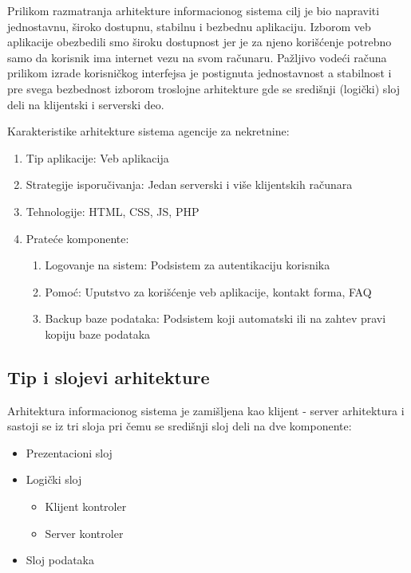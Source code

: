 \documentclass[20pt]{article}
\begin{document}
\indent Prilikom razmatranja arhitekture informacionog sistema cilj je bio napraviti jednostavnu, \v {s}iroko dostupnu, stabilnu i bezbednu aplikaciju. Izborom veb aplikacije obezbedili smo \v {s}iroku dostupnost jer je za njeno kori\v {s}\' {c}enje potrebno samo da korisnik ima internet vezu na svom ra\v {c}unaru. Pa\v {z}ljivo vode\' {c}i ra\v {c}una prilikom izrade korisni\v {c}kog interfejsa je postignuta jednostavnost a stabilnost i pre svega bezbednost izborom troslojne arhitekture gde se sredi\v {s}nji (logi\v {c}ki) sloj deli na klijentski i serverski deo. 

Karakteristike arhitekture sistema agencije za nekretnine:
\begin{enumerate}
         \item  Tip aplikacije: Veb aplikacija
         \item  Strategije isporu\v {c}ivanja: Jedan serverski i vi\v {s}e klijentskih ra\v {c}unara
         \item  Tehnologije: HTML, CSS, JS, PHP
         \item  Prate\' {c}e komponente:
         \begin{enumerate}
            \item Logovanje na sistem: Podsistem za autentikaciju korisnika
            \item Pomo\' {c}: Uputstvo za kori\v {s}\' {c}enje veb aplikacije, kontakt forma, FAQ
            \item Backup baze podataka: Podsistem koji automatski ili na zahtev pravi kopiju baze podataka
         \end{enumerate}
\end{enumerate}

\subsection{\bfseries \Large Tip i slojevi arhitekture}
\setlength{\parindent}{1cm}
\fontsize{13}{18} \selectfont 

 Arhitektura informacionog sistema je zami\v {s}ljena kao klijent - server arhitektura i sastoji se iz tri sloja pri \v {c}emu se sredi\v {s}nji sloj deli na dve komponente: 
 \begin{itemize}
    \item Prezentacioni sloj
    \item Logi\v {c}ki sloj
    \begin{itemize}
        \item Klijent kontroler 
        \item Server kontroler
    \end{itemize}
    \item Sloj podataka
\end{itemize}
 
\end{document}
